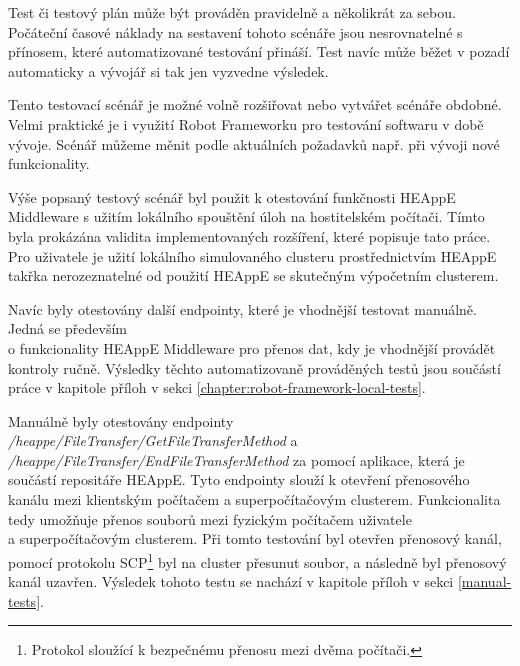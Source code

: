 Test či testový plán může být prováděn pravidelně a několikrát za sebou. Počáteční časové náklady na sestavení tohoto scénáře jsou nesrovnatelné s přínosem, které automatizované testování přináší. Test navíc může běžet v pozadí automaticky a vývojář si tak jen vyzvedne výsledek.


Tento testovací scénář je možné volně rozšiřovat nebo vytvářet scénáře obdobné. Velmi praktické je i využití Robot Frameworku pro testování softwaru v době vývoje. Scénář můžeme měnit podle aktuálních požadavků např. při vývoji nové funkcionality.

Výše popsaný testový scénář byl použit k otestování funkčnosti HEAppE Middleware s užitím lokálního spouštění úloh na hostitelském počítači. Tímto byla prokázána validita implementovaných rozšíření, které popisuje tato práce. Pro uživatele je užití lokálního simulovaného clusteru prostřednictvím HEAppE takřka nerozeznatelné od použití HEAppE se skutečným výpočetním clusterem.

Navíc byly otestovány další endpointy, které je vhodnější testovat manuálně. Jedná se především \\o funkcionality HEAppE Middleware pro přenos dat, kdy je vhodnější provádět kontroly ručně.
Výsledky těchto automatizovaně prováděných testů jsou součástí práce v kapitole příloh v sekci \ref{chapter:robot-framework-local-tests}. 

Manuálně byly otestovány endpointy \emph{/heappe/FileTransfer/GetFileTransferMethod} a \emph{/heappe/FileTransfer/EndFileTransferMethod} za pomocí aplikace, která je součástí repositáře HEAppE. Tyto endpointy slouží k otevření přenosového kanálu mezi klientským počítačem a superpočítačovým clusterem. Funkcionalita tedy umožňuje přenos souborů mezi fyzickým počítačem uživatele \\a superpočítačovým clusterem. Při tomto testování byl otevřen přenosový kanál, pomocí protokolu SCP\footnote{Protokol sloužící k bezpečnému přenosu mezi dvěma počítači.} byl na cluster přesunut soubor, a následně byl přenosový kanál uzavřen. Výsledek tohoto testu se nachází v kapitole příloh v sekci \ref{manual-tests}.

